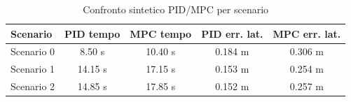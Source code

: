 \begin{table}[H]
    \centering
    \caption{Confronto sintetico PID/MPC per scenario}
    \begin{tabular}{lcccc}
        \toprule
        \textbf{Scenario} & \textbf{PID tempo} & \textbf{MPC tempo} & \textbf{PID err. lat.} & \textbf{MPC err. lat.} \\
        \midrule
        Scenario 0 & 8.50 s & 10.40 s & 0.184 m & 0.306 m \\
        Scenario 1 & 14.15 s & 17.15 s & 0.153 m & 0.254 m \\
        Scenario 2 & 14.85 s & 17.85 s & 0.152 m & 0.257 m \\
        \bottomrule
    \end{tabular}
\end{table}
